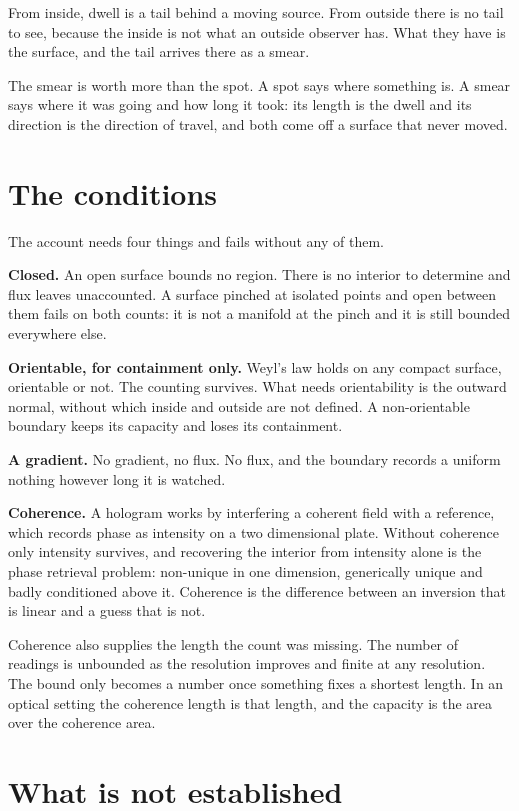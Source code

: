From inside, dwell is a tail behind a moving source. From outside there is no tail to see, because the inside is not what an outside observer has. What they have is the surface, and the tail arrives there as a smear.

The smear is worth more than the spot. A spot says where something is. A smear says where it was going and how long it took: its length is the dwell and its direction is the direction of travel, and both come off a surface that never moved.

\section{The conditions}

The account needs four things and fails without any of them.

\textbf{Closed.} An open surface bounds no region. There is no interior to determine and flux leaves unaccounted. A surface pinched at isolated points and open between them fails on both counts: it is not a manifold at the pinch and it is still bounded everywhere else.

\textbf{Orientable, for containment only.} Weyl's law holds on any compact surface, orientable or not. The counting survives. What needs orientability is the outward normal, without which inside and outside are not defined. A non-orientable boundary keeps its capacity and loses its containment.

\textbf{A gradient.} No gradient, no flux. No flux, and the boundary records a uniform nothing however long it is watched.

\textbf{Coherence.} A hologram works by interfering a coherent field with a reference, which records phase as intensity on a two dimensional plate. Without coherence only intensity survives, and recovering the interior from intensity alone is the phase retrieval problem: non-unique in one dimension, generically unique and badly conditioned above it. Coherence is the difference between an inversion that is linear and a guess that is not.

Coherence also supplies the length the count was missing. The number of readings is unbounded as the resolution improves and finite at any resolution. The bound only becomes a number once something fixes a shortest length. In an optical setting the coherence length is that length, and the capacity is the area over the coherence area.

\section{What is not established}

